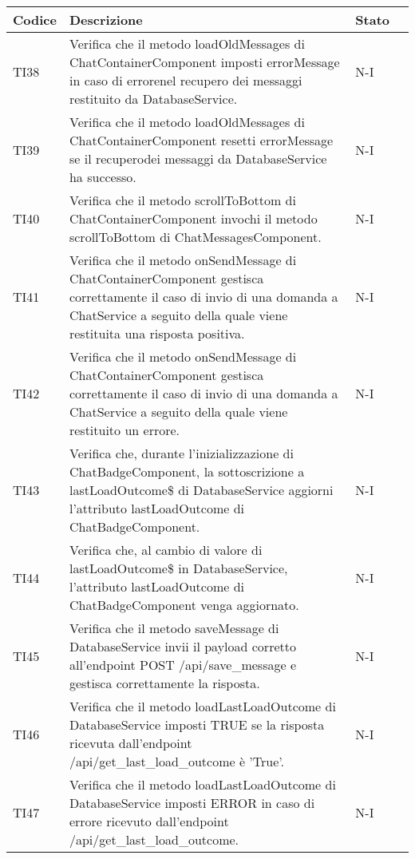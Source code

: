 \begin{table}[h!]
    \centering
    \renewcommand{\arraystretch}{1.5}
    \begin{tabularx}{\textwidth}{|p{}|X|p{}|p{}|}\hline
    \rowcolor[HTML]{FFD700}
    \textbf{Codice} & \textbf{Descrizione} & \textbf{Stato} \\ \hline
    TI38 & Verifica che il metodo loadOldMessages di ChatContainerComponent imposti errorMessage in caso di errorenel recupero dei messaggi restituito da DatabaseService. &  N-I \\ \hline
    TI39 & Verifica che il metodo loadOldMessages di ChatContainerComponent resetti errorMessage se il recuperodei messaggi da DatabaseService ha successo. &  N-I \\ \hline
    TI40 & Verifica che il metodo scrollToBottom di ChatContainerComponent invochi il metodo scrollToBottom di ChatMessagesComponent. &  N-I \\ \hline
    TI41 & Verifica che il metodo onSendMessage di ChatContainerComponent gestisca correttamente il caso di invio di una domanda a ChatService a seguito della quale viene restituita una risposta positiva. &  N-I \\ \hline
    TI42 & Verifica che il metodo onSendMessage di ChatContainerComponent gestisca correttamente il caso di invio di una domanda a ChatService a seguito della quale viene restituito un errore. &  N-I \\ \hline
    TI43 & Verifica che, durante l'inizializzazione di ChatBadgeComponent, la sottoscrizione a lastLoadOutcome\$ di DatabaseService aggiorni l'attributo lastLoadOutcome di ChatBadgeComponent. &  N-I \\ \hline
    TI44 & Verifica che, al cambio di valore di lastLoadOutcome\$ in DatabaseService, l'attributo lastLoadOutcome di ChatBadgeComponent venga aggiornato. &  N-I \\ \hline
    TI45 & Verifica che il metodo saveMessage di DatabaseService invii il payload corretto all’endpoint POST /api/save\_message e gestisca correttamente la risposta. &  N-I \\ \hline
    TI46 & Verifica che il metodo loadLastLoadOutcome di DatabaseService imposti TRUE se la risposta ricevuta dall'endpoint /api/get\_last\_load\_outcome è 'True'. &  N-I \\ \hline
    TI47 & Verifica che il metodo loadLastLoadOutcome di DatabaseService imposti ERROR in caso di errore ricevuto dall'endpoint /api/get\_last\_load\_outcome. &  N-I \\ \hline

\end{tabularx}
\end{table}
